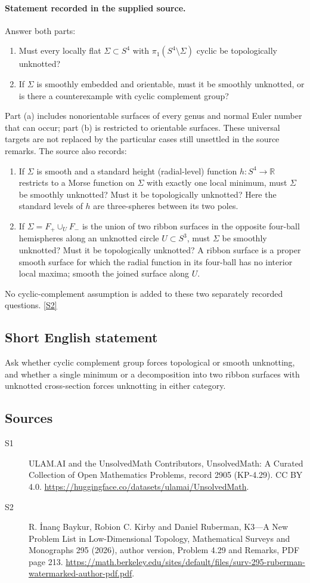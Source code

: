 \documentclass[11pt]{article}
\newcommand{\sref}[2]{\hyperlink{source:#1:#2}{[S#2]}}
\begin{document}
\paragraph{Statement recorded in the supplied source.}
Answer both parts:
\begin{enumerate}
\item[(a)] Must every locally flat $\Sigma\subset S^4$ with $\pi_1(S^4\setminus\Sigma)$ cyclic be topologically unknotted?
\item[(b)] If $\Sigma$ is smoothly embedded and orientable, must it be smoothly unknotted, or is there a counterexample with cyclic complement group?
\end{enumerate}
Part (a) includes nonorientable surfaces of every genus and normal Euler number that can occur; part (b) is restricted to orientable surfaces. These universal targets are not replaced by the particular cases still unsettled in the source remarks. The source also records:
\begin{enumerate}
\item[(i)] If $\Sigma$ is smooth and a standard height (radial-level) function $h:S^4\to\mathbb R$ restricts to a Morse function on $\Sigma$ with exactly one local minimum, must $\Sigma$ be smoothly unknotted? Must it be topologically unknotted? Here the standard levels of $h$ are three-spheres between its two poles.
\item[(ii)] If $\Sigma=F_+\cup_U F_-$ is the union of two ribbon surfaces in the opposite four-ball hemispheres along an unknotted circle $U\subset S^3$, must $\Sigma$ be smoothly unknotted? Must it be topologically unknotted? A ribbon surface is a proper smooth surface for which the radial function in its four-ball has no interior local maxima; smooth the joined surface along $U$.
\end{enumerate}
No cyclic-complement assumption is added to these two separately recorded questions. \sref{2905}{2}
\subsection{Short English statement}
Ask whether cyclic complement group forces topological or smooth unknotting, and whether a single minimum or a decomposition into two ribbon surfaces with unknotted cross-section forces unknotting in either category.
\subsection{Sources}
\begin{description}
\item[\hypertarget{source:2905:1}{S1}] ULAM.AI and the UnsolvedMath Contributors, UnsolvedMath: A Curated Collection of Open Mathematics Problems, record 2905 (KP-4.29). CC BY 4.0. \url{https://huggingface.co/datasets/ulamai/UnsolvedMath}.
\item[\hypertarget{source:2905:2}{S2}] R. İnanç Baykur, Robion C. Kirby and Daniel Ruberman, K3—A New Problem List in Low-Dimensional Topology, Mathematical Surveys and Monographs 295 (2026), author version, Problem 4.29 and Remarks, PDF page 213. \url{https://math.berkeley.edu/sites/default/files/surv-295-ruberman-watermarked-author-pdf.pdf}.
\end{description}
\label{end:2905}
\end{document}
